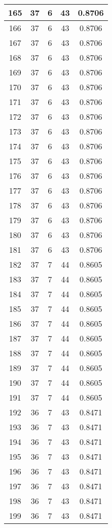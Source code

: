 \documentclass[letterpaper, 12pt]{article}
\begin{document}
\begin{longtable}{|c|c|c|c|c|}
\hline
165 & 37 & 6 & 43 & 0.8706 \\
\hline
166 & 37 & 6 & 43 & 0.8706 \\
\hline
167 & 37 & 6 & 43 & 0.8706 \\
\hline
168 & 37 & 6 & 43 & 0.8706 \\
\hline
169 & 37 & 6 & 43 & 0.8706 \\
\hline
170 & 37 & 6 & 43 & 0.8706 \\
\hline
171 & 37 & 6 & 43 & 0.8706 \\
\hline
172 & 37 & 6 & 43 & 0.8706 \\
\hline
173 & 37 & 6 & 43 & 0.8706 \\
\hline
174 & 37 & 6 & 43 & 0.8706 \\
\hline
175 & 37 & 6 & 43 & 0.8706 \\
\hline
176 & 37 & 6 & 43 & 0.8706 \\
\hline
177 & 37 & 6 & 43 & 0.8706 \\
\hline
178 & 37 & 6 & 43 & 0.8706 \\
\hline
179 & 37 & 6 & 43 & 0.8706 \\
\hline
180 & 37 & 6 & 43 & 0.8706 \\
\hline
181 & 37 & 6 & 43 & 0.8706 \\
\hline
182 & 37 & 7 & 44 & 0.8605 \\
\hline
183 & 37 & 7 & 44 & 0.8605 \\
\hline
184 & 37 & 7 & 44 & 0.8605 \\
\hline
185 & 37 & 7 & 44 & 0.8605 \\
\hline
186 & 37 & 7 & 44 & 0.8605 \\
\hline
187 & 37 & 7 & 44 & 0.8605 \\
\hline
188 & 37 & 7 & 44 & 0.8605 \\
\hline
189 & 37 & 7 & 44 & 0.8605 \\
\hline
190 & 37 & 7 & 44 & 0.8605 \\
\hline
191 & 37 & 7 & 44 & 0.8605 \\
\hline
192 & 36 & 7 & 43 & 0.8471 \\
\hline
193 & 36 & 7 & 43 & 0.8471 \\
\hline
194 & 36 & 7 & 43 & 0.8471 \\
\hline
195 & 36 & 7 & 43 & 0.8471 \\
\hline
196 & 36 & 7 & 43 & 0.8471 \\
\hline
197 & 36 & 7 & 43 & 0.8471 \\
\hline
198 & 36 & 7 & 43 & 0.8471 \\
\hline
199 & 36 & 7 & 43 & 0.8471 \\
\hline
\end{longtable}
\end{document}
